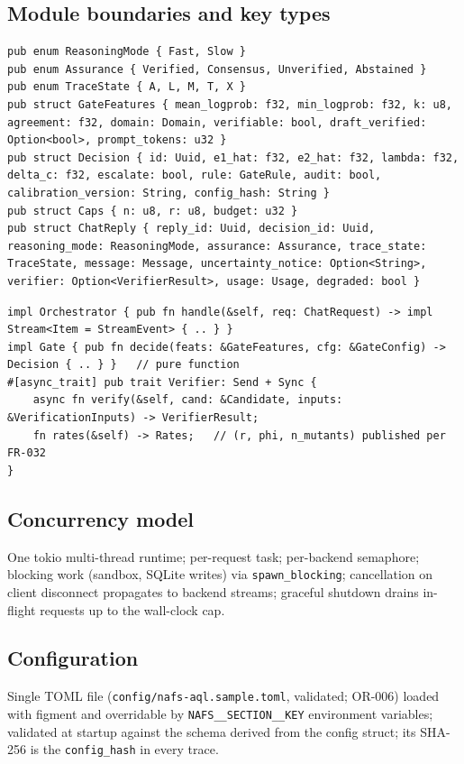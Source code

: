 \documentclass[11pt,a4paper]{article}
\begin{document}
\subsection{Module boundaries and key types}
\begin{lstlisting}[caption={Key types (\texttt{nafs-types})}]
pub enum ReasoningMode { Fast, Slow }
pub enum Assurance { Verified, Consensus, Unverified, Abstained }
pub enum TraceState { A, L, M, T, X }
pub struct GateFeatures { mean_logprob: f32, min_logprob: f32, k: u8, agreement: f32, domain: Domain, verifiable: bool, draft_verified: Option<bool>, prompt_tokens: u32 }
pub struct Decision { id: Uuid, e1_hat: f32, e2_hat: f32, lambda: f32, delta_c: f32, escalate: bool, rule: GateRule, audit: bool, calibration_version: String, config_hash: String }
pub struct Caps { n: u8, r: u8, budget: u32 }
pub struct ChatReply { reply_id: Uuid, decision_id: Uuid, reasoning_mode: ReasoningMode, assurance: Assurance, trace_state: TraceState, message: Message, uncertainty_notice: Option<String>, verifier: Option<VerifierResult>, usage: Usage, degraded: bool }
\end{lstlisting}
\begin{lstlisting}[caption={Module boundaries (\texttt{nafs-core})}]
impl Orchestrator { pub fn handle(&self, req: ChatRequest) -> impl Stream<Item = StreamEvent> { .. } }
impl Gate { pub fn decide(feats: &GateFeatures, cfg: &GateConfig) -> Decision { .. } }   // pure function
#[async_trait] pub trait Verifier: Send + Sync {
    async fn verify(&self, cand: &Candidate, inputs: &VerificationInputs) -> VerifierResult;
    fn rates(&self) -> Rates;   // (r, phi, n_mutants) published per FR-032
}
\end{lstlisting}
\subsection{Concurrency model}
\begin{sloppypar}One tokio multi-thread runtime; per-request task; per-backend semaphore; blocking work (sandbox, SQLite writes) via \texttt{spawn\_blocking}; cancellation on client disconnect propagates to backend streams; graceful shutdown drains in-flight requests up to the wall-clock cap.\end{sloppypar}
\subsection{Configuration}
Single TOML file (\texttt{config/nafs-aql.sample.toml}, validated; OR-006) loaded with figment and overridable by \texttt{NAFS\_\_SECTION\_\_KEY} environment variables; validated at startup against the schema derived from the config struct; its SHA-256 is the \texttt{config\_hash} in every trace.
\end{document}
